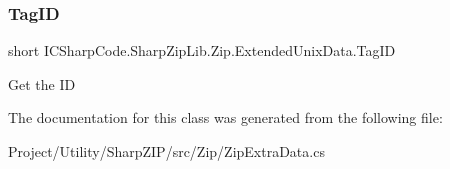 \subsubsection{\texorpdfstring{Tag\+ID}{TagID}}
{\footnotesize\ttfamily short I\+C\+Sharp\+Code.\+Sharp\+Zip\+Lib.\+Zip.\+Extended\+Unix\+Data.\+Tag\+ID\hspace{0.3cm}{\ttfamily [get]}}



Get the ID 



The documentation for this class was generated from the following file\+:\begin{DoxyCompactItemize}
\item 
Project/\+Utility/\+Sharp\+Z\+I\+P/src/\+Zip/Zip\+Extra\+Data.\+cs\end{DoxyCompactItemize}
